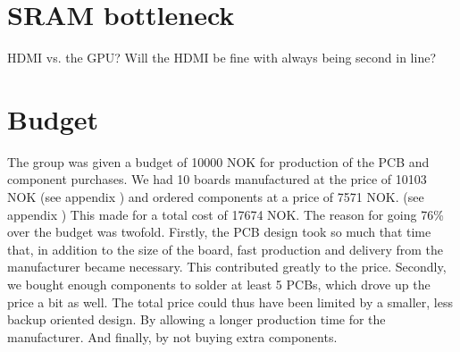 \documentclass[../main/report.tex]{subfiles}
\begin{document}
\section{SRAM bottleneck}
HDMI vs. the GPU?
Will the HDMI be fine with always being second in line?

\section{Budget}
The group was given a budget of 10000 NOK for production of the PCB and component purchases. 
We had 10 boards manufactured at the price of 10103 NOK (see appendix \cite{fig: FPGA_order} ) and ordered components at a price of 7571 NOK. (see appendix \cite{fig: component_order}) 
This made for a total cost of 17674 NOK.
The reason for going 76\% over the budget was twofold. Firstly, the PCB design took so much that time that, in addition to the size of the board, fast production and delivery from the manufacturer became necessary. 
This contributed greatly to the price.
Secondly, we bought enough components to solder at least 5 PCBs, which drove up the price a bit as well.
The total price could thus have been limited by a smaller, less backup oriented design. 
By allowing a longer production time for the manufacturer.
And finally, by not buying extra components.
\end{document}
